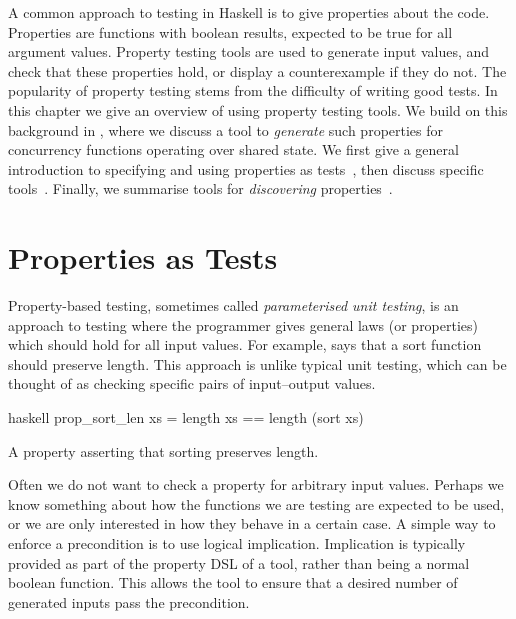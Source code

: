 A common approach to testing in Haskell is to give properties about
the code.  Properties are functions with boolean results, expected to
be true for all argument values.  Property testing tools are used to
generate input values, and check that these properties hold, or
display a counterexample if they do not.  The popularity of property
testing stems from the difficulty of writing good tests.  In this
chapter we give an overview of using property testing tools.  We build
on this background in , where we discuss a tool to
\emph{generate} such properties for concurrency functions operating
over shared state.  We first give a general introduction to specifying
and using properties as tests~, then
discuss specific tools~.  Finally, we
summarise tools for \emph{discovering}
properties~.

\section{Properties as Tests}
\label{sec:property_testing-intro}

Property-based testing\cite{claessen2000}, sometimes called
\emph{parameterised unit testing}, is an approach to testing where the
programmer gives general laws (or properties) which should hold for
all input values.  For example,  says that a
sort function should preserve length.  This approach is unlike typical
unit testing, which can be thought of as checking specific pairs of
input--output values.

\begin{listing}
\centering
\begin{cminted}{haskell}
prop_sort_len xs = length xs == length (sort xs)
\end{cminted}
\caption{A property asserting that sorting preserves length.}\label{lst:prop_sort_len}
\end{listing}

Often we do not want to check a property for arbitrary input values.
Perhaps we know something about how the functions we are testing are
expected to be used, or we are only interested in how they behave in a
certain case.  A simple way to enforce a precondition is to use
logical implication.  Implication is typically provided as part of the
property DSL of a tool, rather than being a normal boolean function.
This allows the tool to ensure that a desired number of generated
inputs pass the precondition.

